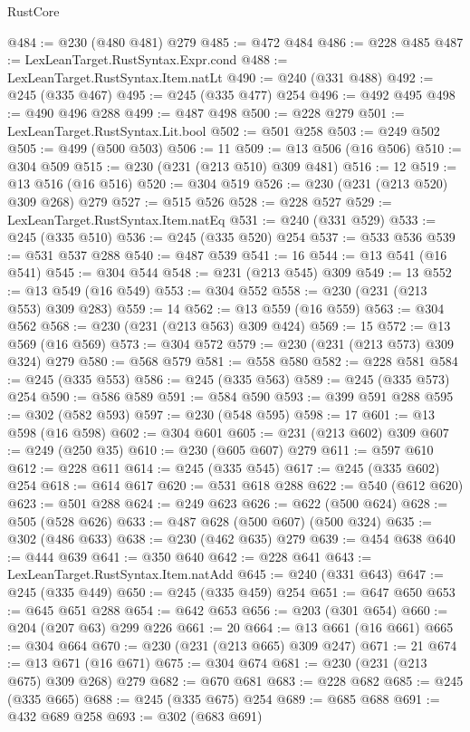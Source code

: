 \begin{lexlean}{RustCore}
\begin{coremodule}
@484 := @230 (@480 @481) @279
@485 := @472 @484
@486 := @228 @485
@487 := LexLeanTarget.RustSyntax.Expr.cond
@488 := LexLeanTarget.RustSyntax.Item.natLt
@490 := @240 (@331 @488)
@492 := @245 (@335 @467)
@495 := @245 (@335 @477) @254
@496 := @492 @495
@498 := @490 @496 @288
@499 := @487 @498
@500 := @228 @279
@501 := LexLeanTarget.RustSyntax.Lit.bool
@502 := @501 @258
@503 := @249 @502
@505 := @499 (@500 @503)
@506 := 11
@509 := @13 @506 (@16 @506)
@510 := @304 @509
@515 := @230 (@231 (@213 @510) @309 @481)
@516 := 12
@519 := @13 @516 (@16 @516)
@520 := @304 @519
@526 := @230 (@231 (@213 @520) @309 @268) @279
@527 := @515 @526
@528 := @228 @527
@529 := LexLeanTarget.RustSyntax.Item.natEq
@531 := @240 (@331 @529)
@533 := @245 (@335 @510)
@536 := @245 (@335 @520) @254
@537 := @533 @536
@539 := @531 @537 @288
@540 := @487 @539
@541 := 16
@544 := @13 @541 (@16 @541)
@545 := @304 @544
@548 := @231 (@213 @545) @309
@549 := 13
@552 := @13 @549 (@16 @549)
@553 := @304 @552
@558 := @230 (@231 (@213 @553) @309 @283)
@559 := 14
@562 := @13 @559 (@16 @559)
@563 := @304 @562
@568 := @230 (@231 (@213 @563) @309 @424)
@569 := 15
@572 := @13 @569 (@16 @569)
@573 := @304 @572
@579 := @230 (@231 (@213 @573) @309 @324) @279
@580 := @568 @579
@581 := @558 @580
@582 := @228 @581
@584 := @245 (@335 @553)
@586 := @245 (@335 @563)
@589 := @245 (@335 @573) @254
@590 := @586 @589
@591 := @584 @590
@593 := @399 @591 @288
@595 := @302 (@582 @593)
@597 := @230 (@548 @595)
@598 := 17
@601 := @13 @598 (@16 @598)
@602 := @304 @601
@605 := @231 (@213 @602) @309
@607 := @249 (@250 @35)
@610 := @230 (@605 @607) @279
@611 := @597 @610
@612 := @228 @611
@614 := @245 (@335 @545)
@617 := @245 (@335 @602) @254
@618 := @614 @617
@620 := @531 @618 @288
@622 := @540 (@612 @620)
@623 := @501 @288
@624 := @249 @623
@626 := @622 (@500 @624)
@628 := @505 (@528 @626)
@633 := @487 @628 (@500 @607) (@500 @324)
@635 := @302 (@486 @633)
@638 := @230 (@462 @635) @279
@639 := @454 @638
@640 := @444 @639
@641 := @350 @640
@642 := @228 @641
@643 := LexLeanTarget.RustSyntax.Item.natAdd
@645 := @240 (@331 @643)
@647 := @245 (@335 @449)
@650 := @245 (@335 @459) @254
@651 := @647 @650
@653 := @645 @651 @288
@654 := @642 @653
@656 := @203 (@301 @654)
@660 := @204 (@207 @63) @299 @226
@661 := 20
@664 := @13 @661 (@16 @661)
@665 := @304 @664
@670 := @230 (@231 (@213 @665) @309 @247)
@671 := 21
@674 := @13 @671 (@16 @671)
@675 := @304 @674
@681 := @230 (@231 (@213 @675) @309 @268) @279
@682 := @670 @681
@683 := @228 @682
@685 := @245 (@335 @665)
@688 := @245 (@335 @675) @254
@689 := @685 @688
@691 := @432 @689 @258
@693 := @302 (@683 @691)

\end{coremodule}
\end{lexlean}
